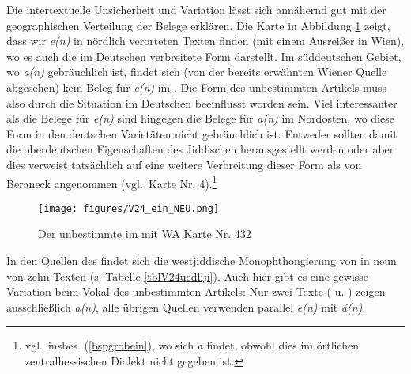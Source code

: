 Die intertextuelle Unsicherheit und Variation lässt sich annähernd gut mit der geographischen Verteilung der Belege erklären. Die Karte in Abbildung \ref{karteV24e} zeigt, dass wir \textit{e(n)}  in nördlich verorteten Texten finden (mit einem Ausreißer in Wien), wo es auch die im Deutschen verbreitete Form darstellt. Im süddeutschen Gebiet, wo \textit{a(n)}  gebräuchlich ist, findet sich (von der bereits erwähnten Wiener Quelle abgesehen) kein Beleg für \textit{e(n)} im . Die Form des unbestimmten Artikels muss also durch die Situation im Deutschen beeinflusst worden sein. Viel interessanter als die Belege für \textit{e(n)} sind hingegen die Belege für \textit{a(n)} im Nordosten, wo diese Form in den deutschen Varietäten nicht gebräuchlich ist. Entweder sollten damit die oberdeutschen Eigenschaften des Jiddischen herausgestellt werden oder aber dies verweist tatsächlich auf eine weitere Verbreitung dieser Form als von Beraneck angenommen (vgl.\,  Karte Nr. 4).\footnote{vgl.\, insbes. (\ref{bspgrobein}), wo sich \textit{a}  findet, obwohl dies im örtlichen zentralhessischen Dialekt nicht gegeben ist.}\\
 

	\begin{figure}
		\centering
\texttt{[image: figures/V24\_ein\_NEU.png]}
		\caption{\label{karteV24e} Der unbestimmte  im  mit WA Karte Nr. 432}
		\end{figure}
 
 
 
In den Quellen des  findet sich die westjiddische Monophthongierung von  in neun von zehn Texten (s. Tabelle \ref{tblV24uedliji}). Auch hier gibt es eine gewisse Variation beim Vokal des unbestimmten Artikels: Nur zwei Texte ( u. ) zeigen ausschließlich \textit{a(n)}, alle übrigen Quellen verwenden parallel \textit{e(n)} mit \textit{ä(n)}. 


